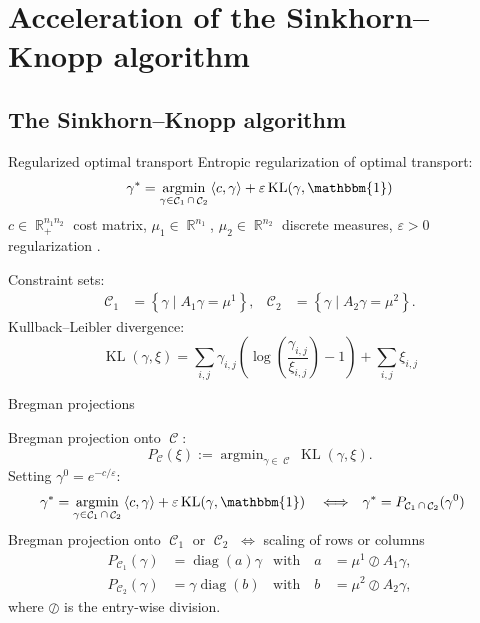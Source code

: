 \documentclass[compress]{beamer}
\newcommand{\scal}[2]{\left\langle #1 , #2 \right\rangle}
\DeclareMathOperator{\IR}{\mathbb{R}}
\DeclareMathOperator*{\argmin}{argmin}
\DeclareMathOperator{\One}{\mathbbm{1}}
\DeclareMathOperator{\Ccal}{\mathcal{C}}
\DeclareMathOperator{\diag}{diag}
\DeclareMathOperator{\KL}{KL}
\renewcommand{\epsilon}{\varepsilon}
\begin{document}
\section[Overrelaxing SK]{Acceleration of  the Sinkhorn--Knopp algorithm }

\subsection[SK algorithm]{The Sinkhorn--Knopp algorithm}
\begin{frame}{Regularized optimal transport}
Entropic regularization of optimal transport:
\begin{equation*} \label{eq:problem}
\gamma^* = \argmin_{\gamma \in \Ccal_1 \cap \Ccal_2}
	\scal{c}{\gamma} + \epsilon \KL(\gamma,\One)
\end{equation*}
$c \in \IR_+^{n_1 n_2}$ cost matrix, $\mu_1 \in \IR^{n_1}$, $\mu_2 \in \IR^{n_2}$ discrete measures, $\epsilon > 0$ regularization .

\pause
Constraint sets:
\begin{align*}
\Ccal_1 &= \left\{ \gamma \mid A_1 \gamma = \mu^1 \right\},
&
\Ccal_2 &= \left\{ \gamma \mid A_2 \gamma = \mu^2 \right\}.
\end{align*}
\pause
Kullback--Leibler divergence:
\begin{equation*}\label{KL}
\KL(\gamma,\xi) = \sum_{i,j} \gamma_{i,j} \left( \log \left( \frac{\gamma_{i,j}}{\xi_{i,j}} \right) -1  \right) + \sum_{i,j} \xi_{i,j}
\end{equation*}
\end{frame}


\begin{frame}{Bregman projections}
	
Bregman projection onto $\Ccal$:
\[
P_{\Ccal}(\xi) := \argmin_{\gamma \in \Ccal} \KL(\gamma,\xi).
\]
\pause
Setting $\gamma^0 = e^{-c/\epsilon}$:
\begin{align*}
\gamma^* &= \argmin_{\gamma \in \Ccal_1 \cap \Ccal_2}
	\scal{c}{\gamma} + \epsilon \KL(\gamma,\One)
& &\Longleftrightarrow &
\gamma^* &= P_{\Ccal_1 \cap \Ccal_2}(\gamma^0)
\end{align*}
\pause
Bregman projection onto $\Ccal_1$ or $\Ccal_2$ $\Longleftrightarrow$ scaling of rows or columns
\begin{align*}\label{scaling}
P_{\Ccal_1}(\gamma) &= \diag(a) \gamma &\text{with}\quad
a &=  {\mu^1}\oslash{A_1 \gamma}, \\
P_{\Ccal_2}(\gamma) &= \gamma \diag(b) &\text{with}\quad
b &= {\mu^2}\oslash{A_2 \gamma},\nonumber
\end{align*}
where $\oslash$ is the entry-wise division.
\end{frame}
\end{document}
